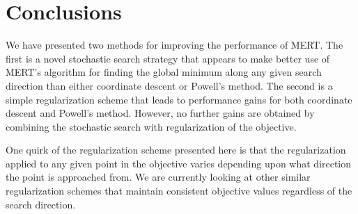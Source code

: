 \documentclass[11pt]{article}
\begin{document}
\section{Conclusions}

We have presented two methods for improving the performance of MERT. The first is a novel stochastic search strategy that appears to make better use of MERT's algorithm for finding the global minimum along any given search direction than either coordinate descent or Powell's method. The second is a simple regularization scheme that leads to performance gains for both coordinate descent and Powell's method. However, no further gains are obtained by combining the stochastic search with regularization of the objective.   

One quirk of the regularization scheme presented here is that the regularization applied to any given point in the objective varies depending upon what direction the point is approached from. We are currently looking at other similar regularization schemes that maintain consistent objective values regardless of the search direction.  




\end{document}
